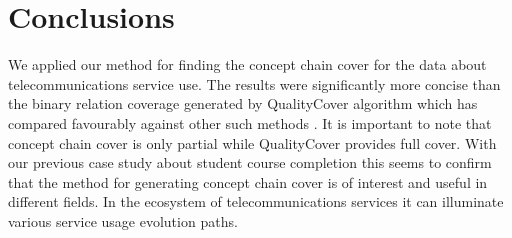 \documentclass[acmconf,authordraft]{acmart}
\begin{document}
\section{Conclusions}

We applied our method for finding the concept chain cover for the data about telecommunications service use. The results were significantly more concise than the binary relation coverage generated by QualityCover algorithm which has compared favourably against other such methods \cite{mouakher_qualitycover:_2016}. It is important to note that concept chain cover is only partial while QualityCover provides full cover. With our previous  case study about student course completion \cite{torim_covering_2019} this seems to confirm that the method for generating concept chain cover is of interest and useful in different fields. In the ecosystem of telecommunications services it can illuminate various service usage evolution paths.



\end{document}
